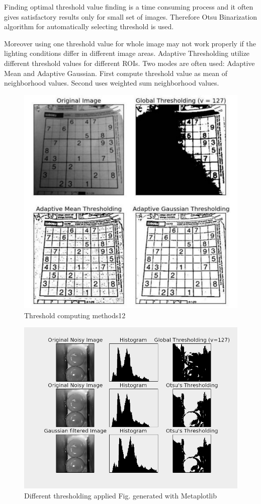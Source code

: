 \documentclass[12pt,twoside,a4paper]{article}
\begin{document}
Finding optimal threshold value finding is a time consuming process and it often gives satisfactory results only for small set of images.
Therefore Otsu Binarization algorithm for automatically selecting threshold is used.

Moreover using one threshold value for whole image may not work properly if the lighting conditions differ in different image areas.\cite{thre}
Adaptive Thresholding utilize different threshold values for different ROIs. 
Two modes are often used: Adaptive Mean and Adaptive Gaussian.
First compute threshold value as mean of neighborhood values.
Second uses weighted sum neighborhood values.
 
\begin{figure}[H]
\centering
\includegraphics[width=0.4\paperwidth]{thremeth}
\caption{Threshold computing methods12\cite{thre}}
\end{figure}
 
\begin{figure}[H]
\centering
\includegraphics[width=0.4\paperwidth]{diffthr}
\caption{Different thresholding applied
Fig. generated with Metaplotlib}
\end{figure}
\end{document}

